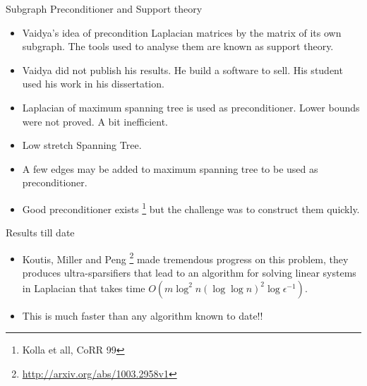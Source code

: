 \documentclass[10pt,sans,serif,trans]{beamer}
\begin{document}
\begin{frame}{Subgraph Preconditioner and Support theory}
   \begin{itemize}
      \item Vaidya's idea of precondition Laplacian matrices by the matrix of its own subgraph. The
tools used to analyse them are known as support theory.
\item Vaidya did not publish his results. He build a software to sell. His student used his work in
his dissertation.
\item Laplacian of maximum spanning tree is used as preconditioner. Lower bounds were not proved. A
bit inefficient.
\item \color{red}Low stretch Spanning Tree\color{black}.
\item A few edges may be added to maximum spanning tree to be used as preconditioner.
\item Good preconditioner exists \footnote{Kolla et all, CoRR 99} but the challenge was to construct
them quickly.
\end{itemize}
\end{frame}

\begin{frame}{Results till date}
\begin{itemize}
\item Koutis, Miller and Peng \footnote{\url{http://arxiv.org/abs/1003.2958v1}} made tremendous
progress on this problem, they produces ultra-sparsifiers that lead to an algorithm for solving
linear systems in Laplacian that takes time $O(m\log^2{n}(\log{\log{n}})^2 \log{\epsilon^{-1}})$.
\item \color{red}This is much faster than any algorithm known to date!!\color{black}
\end{itemize}
\end{frame}

% 
% 
\end{document}
